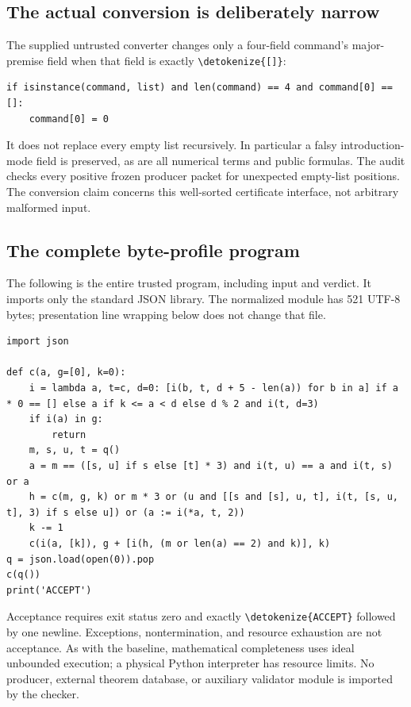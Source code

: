 \documentclass[11pt,letterpaper]{article}
\theoremstyle{definition}
\theoremstyle{remark}
\newcommand{\file}[1]{\expandafter\nolinkurl\expandafter{\detokenize{#1}}}
\begin{document}
\subsection{The actual conversion is deliberately narrow}

The supplied untrusted converter changes only a four-field command's
major-premise field when that field is exactly \file{[]}:
\begin{lstlisting}
if isinstance(command, list) and len(command) == 4 and command[0] == []:
    command[0] = 0
\end{lstlisting}
It does not replace every empty list recursively. In particular a falsy
introduction-mode field is preserved, as are all numerical terms and
public formulas. The audit checks every positive frozen producer packet
for unexpected empty-list positions. The conversion claim concerns this
well-sorted certificate interface, not arbitrary malformed input.

\subsection{The complete byte-profile program}

The following is the entire trusted program, including input and verdict.
It imports only the standard JSON library. The normalized module has 521
UTF-8 bytes; presentation line wrapping below does not change that file.
\begin{lstlisting}
import json

def c(a, g=[0], k=0):
    i = lambda a, t=c, d=0: [i(b, t, d + 5 - len(a)) for b in a] if a * 0 == [] else a if k <= a < d else d % 2 and i(t, d=3)
    if i(a) in g:
        return
    m, s, u, t = q()
    a = m == ([s, u] if s else [t] * 3) and i(t, u) == a and i(t, s) or a
    h = c(m, g, k) or m * 3 or (u and [[s and [s], u, t], i(t, [s, u, t], 3) if s else u]) or (a := i(*a, t, 2))
    k -= 1
    c(i(a, [k]), g + [i(h, (m or len(a) == 2) and k)], k)
q = json.load(open(0)).pop
c(q())
print('ACCEPT')
\end{lstlisting}

Acceptance requires exit status zero and exactly \file{ACCEPT} followed
by one newline. Exceptions, nontermination, and resource exhaustion are
not acceptance. As with the baseline, mathematical completeness uses
ideal unbounded execution; a physical Python interpreter has resource
limits. No producer, external theorem database, or auxiliary validator
module is imported by the checker.
\end{document}
